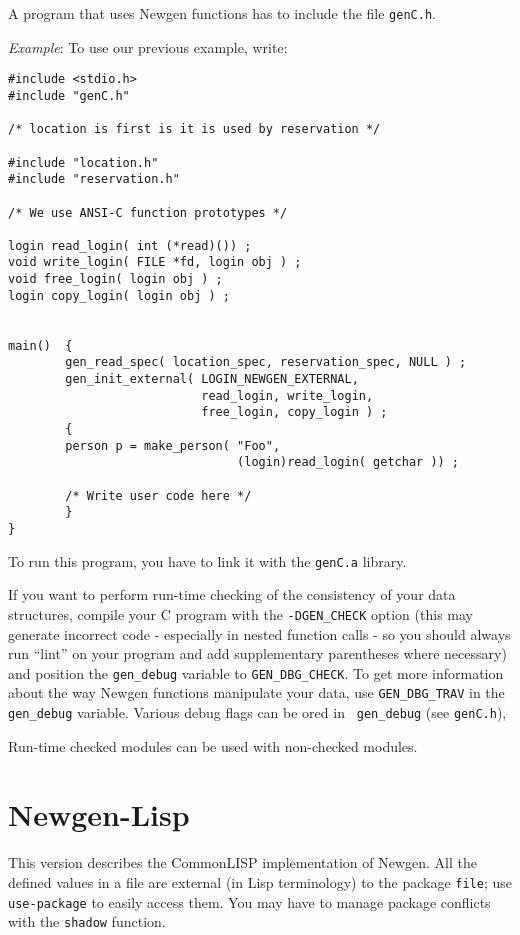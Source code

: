 A program that uses Newgen functions has to include the file {\tt genC.h}.

{\em Example}: To use our previous example, write:
\begin{verbatim}
#include <stdio.h>
#include "genC.h"

/* location is first is it is used by reservation */

#include "location.h"
#include "reservation.h"

/* We use ANSI-C function prototypes */

login read_login( int (*read)()) ;
void write_login( FILE *fd, login obj ) ;
void free_login( login obj ) ;
login copy_login( login obj ) ;


main()  {
        gen_read_spec( location_spec, reservation_spec, NULL ) ;
        gen_init_external( LOGIN_NEWGEN_EXTERNAL, 
                           read_login, write_login, 
                           free_login, copy_login ) ;
        {
        person p = make_person( "Foo", 
                                (login)read_login( getchar )) ;

        /* Write user code here */
        }
}       
\end{verbatim}

To run this program, you have to link it with the {\tt genC.a} library.

If you want to perform run-time checking of the consistency of your data
structures, compile your C program with the {\tt -DGEN\_CHECK} option
(this may generate incorrect code - especially in nested function calls -
so you should always run ``lint'' on your program and add supplementary
parentheses where necessary) and position the {\tt gen\_debug} variable
to {\tt GEN\_DBG\_CHECK}. To get more information about the way Newgen
functions manipulate your data, use {\tt GEN\_DBG\_TRAV} in the {\tt
gen\_debug} variable. Various debug flags can be ored in {\tt
gen\_debug} (see {\tt genC.h}),

Run-time checked modules can be used with non-checked modules.

\section{Newgen-Lisp}

This version describes the CommonLISP implementation of Newgen. All the
defined values in a file are external (in Lisp terminology) to the
package {\tt file}; use {\tt use-package} to easily access them. You may
have to manage package conflicts with the {\tt shadow} function.

